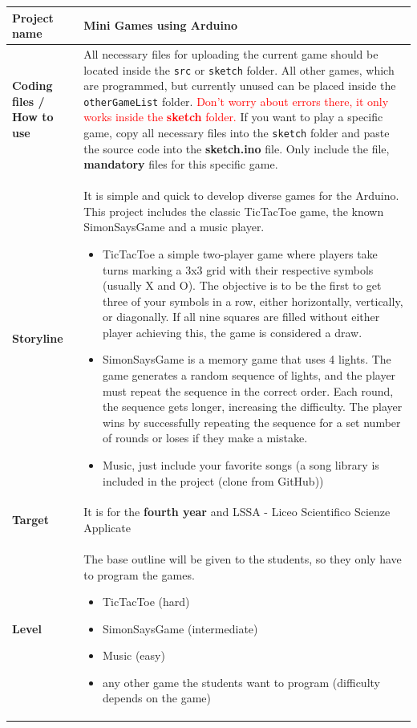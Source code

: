 \documentclass[10pt]{article}
\begin{document}
\begin{longtable}{|p{3.5cm}|p{11cm}|}
  \hline
  \textbf{Project name} & \textbf{Mini Games} using Arduino  \\ \hline
  
  \textbf{Coding files / How to use} & All necessary files for uploading the current game should be located inside the \texttt{src} or \texttt{sketch} folder. All other games, which are programmed, but currently unused can be placed inside the \texttt{otherGameList} folder. \textcolor{red}{Don't worry about errors there, it only works inside the \textbf{sketch} folder.} If you want to play a specific game, copy all necessary files into the \texttt{sketch} folder and paste the source code into the \textbf{sketch.ino} file. Only include the file, \textbf{mandatory} files for this specific game. \\ \hline
  
  \textbf{Storyline} & It is simple and quick to develop diverse games for the Arduino. This project includes the classic TicTacToe game, the known SimonSaysGame and a music player. 
  \begin{itemize}
    \item TicTacToe a simple two-player game where players take turns marking a 3x3 grid with their respective symbols (usually X and O). The objective is to be the first to get three of your symbols in a row, either horizontally, vertically, or diagonally. If all nine squares are filled without either player achieving this, the game is considered a draw.
    \item SimonSaysGame is a memory game that uses 4 lights. The game generates a random sequence of lights, and the player must repeat the sequence in the correct order. Each round, the sequence gets longer, increasing the difficulty. The player wins by successfully repeating the sequence for a set number of rounds or loses if they make a mistake.
    \item Music, just include your favorite songs (a song library is included in the project (clone from GitHub))
  \end{itemize}\\ \hline
  
  \textbf{Target} & It is for the \textbf{fourth year} and LSSA - Liceo Scientifico Scienze Applicate \\ \hline
  
  \textbf{Level} & 
  The base outline will be given to the students, so they only have to program the games.
  \begin{itemize}
    \item TicTacToe (hard)
    \item SimonSaysGame (intermediate)
    \item Music (easy)
    \item any other game the students want to program (difficulty depends on the game)
  \end{itemize} \\ \hline
  

\end{longtable}
\end{document}
